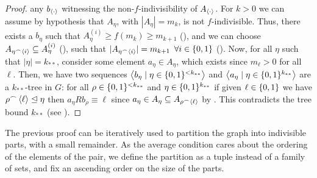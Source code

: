 \begin{lemma}
\begin{proof}
                any $b_{\left< \cdot \right>}$ witnessing the non-$f$-indivisibility of $A_{\left< \cdot \right>}$.
                For $k > 0$ we can assume by hypothesis that $A_\eta$, with $|A_\eta| = m_{k}$, is not $f$-indivisible.
                Thus, there exists a $b_\eta$ such that $A_\eta^{(i)} \geq f(m_{k}) \geq m_{k+1}$ (), and we can choose
                $A_{\eta^\frown \left< i \right>} \subseteq A_\eta^{(i)}$ (), such that
                $|A_{\eta^\frown \left< i \right>}| = m_{k+1}$ $\forall i \in \{ 0,1 \}$ ().
                Now, for all $\eta$ such that $|\eta| = k_{**}$, consider some element $a_\eta \in A_\eta$, which exists since $m_\ell > 0$
                for all $\ell$.
                Then, we have two sequences $\left< b_\eta \mid \eta \in \{ 0,1 \}^{<k_{**}} \right>$ and $\left< a_\eta \mid \eta \in \{ 0,1 \}^{k_{**}} \right>$
                are a $k_{**}$-tree in $G$: for all $\rho \in \{ 0,1 \}^{<k_{**}}$ and $\eta \in \{ 0,1 \}^{k_{**}}$
                if given $\ell \in \{ 0, 1 \}$ we have $\rho^\frown \left< \ell \right> \trianglelefteq \eta$ then
                $a_\eta R b_\rho \equiv \ell$ since $a_\eta \in A_\eta \subseteq A_{\rho ^\frown \left< \ell \right>}$ by .
                This contradicts the tree bound $k_{**}$ (see ).
            \end{proof}
        \end{lemma}

        The previous proof can be iteratively used to partition the graph into indivisible parts, with a small remainder.
        As the average condition cares about the ordering of the elements of the pair, we define the partition as a tuple
        instead of a family of sets, and fix an ascending order on the size of the parts.

